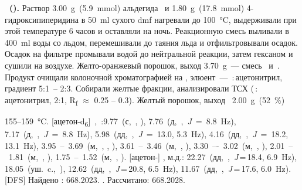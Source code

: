 \textbf{~().}
Раствор \SI{3.00}{\gram}~(\SI{5.9}{\mmol}) альдегида~ и \SI{1.80}{\gram}~(\SI{17.8}{\mmol}) 4-гидроксипиперидина в \SI{50}{\milli\litre} сухого \ac{dmf} нагревали до \SI{100}{\celsius}, выдерживали при этой температуре 6 часов и оставляли на ночь.
Реакционную смесь выливали в \SI{400}{\milli\litre} воды со льдом, перемешивали до таяния льда и отфильтровывали осадок.
Осадок на фильтре промывали водой до нейтральной реакции, затем гексаном и сушили на воздухе.
Желто-оранжевый порошок, выход \SI{3.70}{\gram}~--- смесь~ и~.
Продукт очищали колоночной хроматографией на , элюент~--- \,:\,ацетонитрил, градиент 5:1~-- 2:3. Собирали желтые фракции, анализировали ТСХ (\,:\,ацетонитрил, 2:1, R\textsubscript{f} $\approx$ 0.25 -- 0.3).
Желтый порошок, выход~ \SI{2.00}{\gram}~(\SI{52}{\percent})
\begin{experimental}[]
     155--\SI{159}{\celsius}.
    [ацетон-d\textsubscript{6}]~\chemdelta{},~\si{\ppm}:9.77~(с,~, ), 7.76~(д,~,~\textit{J}~=~8.8~\si{\hertz}), 7.17~(д,~,~\textit{J}~=~8.8~\si{\hertz}), 5.98~(дд,~,~\textit{J}~=~13.0, 5.3~\si{\hertz}), 4.16~(дд,~,~\textit{J}~=~18.2, 13.1~\si{\hertz}), 3.95~--~3.69~(м,~, , ), 3.61~--~3.46~(м,~, ), 3.30~–-~3.02~(м,~, ), 2.01~--~1.81~(м,~, ), 1.75~--~1.52~(м,~, ).
    [ацетон-] \chemdelta, м.д.: 22.27~(дд,~,~\textit{J}\,=\,18.4, 6.9~\si{\hertz}), 18.05~(уш.~c.,~), 12.62~(дд,~,~\textit{J}\,=\,20.8, 6.5~\si{\hertz}), 11.67~(дд,~,~\textit{J}\,=\,17.6, 6.0~\si{\hertz}).
    [DFS] Найдено \ce{[M+]}: \num{668.2023}. . Рассчитано:  \num{668.2028}.
\end{experimental}

